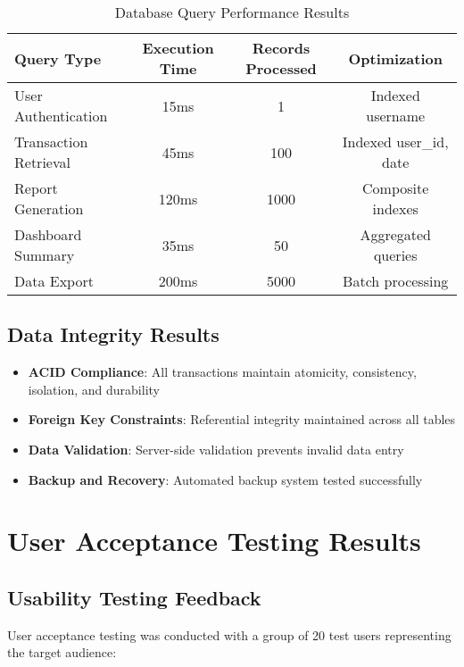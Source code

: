 \begin{table}[h]
\centering
\begin{tabular}{|l|c|c|c|}
\hline
\textbf{Query Type} & \textbf{Execution Time} & \textbf{Records Processed} & \textbf{Optimization} \\
\hline
User Authentication & 15ms & 1 & Indexed username \\
\hline
Transaction Retrieval & 45ms & 100 & Indexed user\_id, date \\
\hline
Report Generation & 120ms & 1000 & Composite indexes \\
\hline
Dashboard Summary & 35ms & 50 & Aggregated queries \\
\hline
Data Export & 200ms & 5000 & Batch processing \\
\hline
\end{tabular}
\caption{Database Query Performance Results}
\end{table}

\subsection{Data Integrity Results}

\begin{itemize}
    \item \textbf{ACID Compliance}: All transactions maintain atomicity, consistency, isolation, and durability
    \item \textbf{Foreign Key Constraints}: Referential integrity maintained across all tables
    \item \textbf{Data Validation}: Server-side validation prevents invalid data entry
    \item \textbf{Backup and Recovery}: Automated backup system tested successfully
\end{itemize}

\section{User Acceptance Testing Results}

\subsection{Usability Testing Feedback}

User acceptance testing was conducted with a group of 20 test users representing the target audience:

